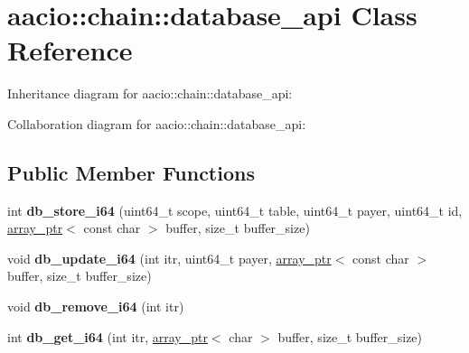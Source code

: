 \hypertarget{classaacio_1_1chain_1_1database__api}{}\section{aacio\+:\+:chain\+:\+:database\+\_\+api Class Reference}
\label{classaacio_1_1chain_1_1database__api}


Inheritance diagram for aacio\+:\+:chain\+:\+:database\+\_\+api\+:


Collaboration diagram for aacio\+:\+:chain\+:\+:database\+\_\+api\+:
\subsection*{Public Member Functions}
\begin{DoxyCompactItemize}
\item 
\mbox{\label{classaacio_1_1chain_1_1database__api_aa0e104916f6118d3343cc5ca1e0b23a4}} 
int {\bfseries db\+\_\+store\+\_\+i64} (uint64\+\_\+t scope, uint64\+\_\+t table, uint64\+\_\+t payer, uint64\+\_\+t id, \mbox{\hyperlink{structaacio_1_1chain_1_1array__ptr}{array\+\_\+ptr}}$<$ const char $>$ buffer, size\+\_\+t buffer\+\_\+size)
\item 
\mbox{\label{classaacio_1_1chain_1_1database__api_af63ae52c434a7354995b9d40cf17480c}} 
void {\bfseries db\+\_\+update\+\_\+i64} (int itr, uint64\+\_\+t payer, \mbox{\hyperlink{structaacio_1_1chain_1_1array__ptr}{array\+\_\+ptr}}$<$ const char $>$ buffer, size\+\_\+t buffer\+\_\+size)
\item 
\mbox{\label{classaacio_1_1chain_1_1database__api_afdc657e730f9c8bc9404cea32ba1ea2b}} 
void {\bfseries db\+\_\+remove\+\_\+i64} (int itr)
\item 
\mbox{\label{classaacio_1_1chain_1_1database__api_a6cb50062f63bc7aee526d0dc736d9d58}} 
int {\bfseries db\+\_\+get\+\_\+i64} (int itr, \mbox{\hyperlink{structaacio_1_1chain_1_1array__ptr}{array\+\_\+ptr}}$<$ char $>$ buffer, size\+\_\+t buffer\+\_\+size)
\item 
\mbox{\label{classaacio_1_1chain_1_1database__api_ae75cb868bc6993c5ad861121f644a17f}} 

\end{DoxyCompactItemize}
